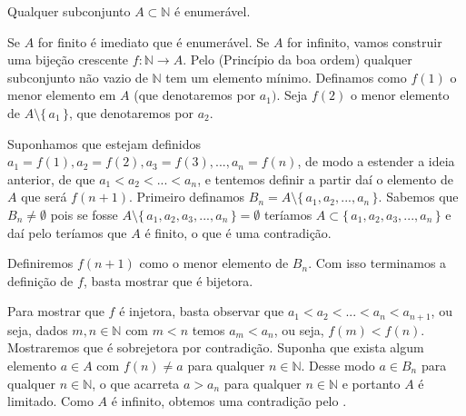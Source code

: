 \documentclass[../main.tex]{subfiles}
\begin{document}
\begin{teo}\label{enum-teo-subconjuntoNEnumeravel}
    Qualquer subconjunto $A \subset \mathbb{N}$ é enumerável.
\end{teo}
\begin{dem}
    Se $A$ for finito é imediato que é enumerável. Se $A$ for infinito, vamos construir uma bijeção crescente  $f \colon \mathbb{N} \to A$.
    Pelo  (Princípio da boa ordem) qualquer subconjunto não vazio de $\mathbb{N}$ tem um elemento mínimo. Definamos como $f(1)$ o menor elemento em $A$ (que denotaremos por $a_1)$. Seja $f(2)$ o menor elemento de $A \setminus \{\,a_1\,\}$, que denotaremos por $a_2$. 
    
    Suponhamos que estejam definidos $a_1 = f(1), a_2=f(2), a_3=f(3), ..., a_n=f(n)$, de modo a estender a ideia anterior, de que $a_1 < a_2 < ... < a_n$, e tentemos definir a partir daí o elemento de $A$ que será $f(n+1)$. Primeiro definamos $B_n = A \setminus \{\,a_1,a_2,...,a_n\,\}$. Sabemos que $B_n \neq \emptyset$ pois se fosse $A \setminus \{\,a_1,a_2,a_3,...,a_n\,\} = \emptyset$ teríamos $A \subset \{\,a_1,a_2,a_3,...,a_n\,\}$ e daí pelo  teríamos que $A$ é finito, o que é uma contradição.

    Definiremos $f(n+1)$ como o menor elemento de $B_n$. Com isso terminamos a definição de $f$, basta mostrar que é bijetora.

    Para mostrar que $f$ é injetora, basta observar que $a_1 < a_2 < ... < a_n < a_{n+1}$, ou seja, dados $m,n \in \mathbb{N}$ com $m < n$ temos $a_m < a_n$, ou seja, $f(m) < f(n)$. 
    Mostraremos que é sobrejetora por contradição. Suponha que exista algum elemento $a \in A$ com $f(n) \neq a$ para qualquer $n \in \mathbb{N}$.
    Desse modo $a \in B_n$ para qualquer $n \in \mathbb{N}$, o que acarreta $a > a_n $ para qualquer $n \in \mathbb{N}$ e portanto $A$ é limitado. Como $A$ é infinito, obtemos uma contradição pelo .
\end{dem}
\end{document}
